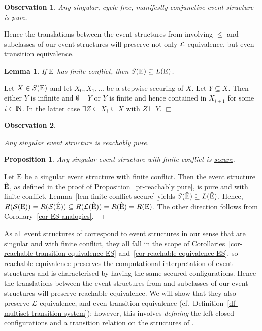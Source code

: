 \documentclass[twocolumn]{article}
\newtheorem{prop}{Proposition}[section]
\newtheorem{lemm}{Lemma}
\newtheorem{obs}{Observation}[section]
\newenvironment{proposition}[1]{\begin{prop} \rm \label{pr-#1} }{\end{prop}}
\newenvironment{lemma}[1]{\begin{lemm} \rm \label{lem-#1} }{\end{lemm}}
\newenvironment{observation}[1]{\begin{obs} \rm \label{obs-#1} }{\end{obs}}
\newenvironment{proof}{\begin{trivlist} \item[\hspace{\labelsep}\bf
Proof:]}{\hfill $\Box$\end{trivlist}}
\newcommand{\df}[1]{Definition~\ref{df-#1}}
\newcommand{\pr}[1]{Proposition~\ref{pr-#1}}
\newcommand{\lem}[1]{Lemma~\ref{lem-#1}}
\newcommand{\cor}[1]{Corollary~\ref{cor-#1}}
\newcommand{\dl}[1]{\mbox{\rm I\hspace{-0.75mm}#1}}     \newcommand{\dc}[1]{\mbox{\rm {\raisebox{.4ex}{\makebox [0pt][l]{\hspace{.2em}\scriptsize $\mid$}}}#1}}
\newcommand{\IN}{\dl{N}}                        \newcommand{\IQ}{\dc{Q}}                        \newcommand{\IC}{\dc{C}}                        \newcommand{\IE}{\dl{E}}                        \newcommand{\IG}{\dc{G}}                        \newcommand{\fC}{{\cal C}}                      \newcommand{\fE}{{\cal E}}                      \newcommand{\fG}{{\cal G}}                      \newcommand{\fN}{{\cal N}}                      \newcommand{\fF}{{\cal F}}                      \newcommand{\fL}{{\cal L}}                      \newcommand{\fM}{{\cal M}}                      \newcommand{\fS}{{\cal S}}                      \newcommand{\fR}{{\cal R}}                      \newcommand{\eC}{{\rm C}}                       \newcommand{\eD}{{\rm D}}                       \newcommand{\eE}{{\rm E}}                       \newcommand{\eF}{{\rm F}}                       \newcommand{\eG}{{\rm G}}                       \newcommand{\eH}{{\rm H}}                       \newcommand{\eK}{{\rm K}}                       \newcommand{\eL}{{\rm L}}                       \newcommand{\eN}{{\rm N}}                       \newcommand{\eP}{{\rm P}}                       \newcommand{\eM}{{\rm M}}                       \newcommand{\eT}{{\rm T}}                       \newcommand{\fT}{{\cal T}}
\begin{document}
\begin{observation}{manifestly conjunctive}
Any singular, cycle-free, manifestly conjunctive event structure is pure.
\end{observation}
Hence the translations between the event structures from
\cite{NPW81,Wi87a,Wi89} involving $\leq$ and subclasses of our event
structures will preserve not only $\fL$-equivalence, but even transition
equivalence.

\begin{lemma}{finite conflict secure}
If $\eE$ has finite conflict, then $S(\eE)\subseteq L(\eE)$.
\end{lemma}
\begin{proof}
Let $X \in S(\eE)$ and let $X_0,X_1,\ldots$ be a stepwise securing of $X$.
Let $Y \subseteq X$. Then either $Y$ is infinite and $\emptyset \vdash Y$ or
$Y$ is finite and hence contained in $X_{i+1}$ for some $i\in\IN$.
In the latter case $\exists Z\subseteq X_i \subseteq X$ with $Z \vdash Y$.
\end{proof}

\begin{observation}{singular}~\vspace{-6pt}
\item Any singular event structure is reachably pure.
\end{observation}

\begin{proposition}{finite conflict secure}
Any singular event structure with finite conflict is \hyperref[secure]{secure}.
\end{proposition}
\begin{proof}
Let $\eE$ be a singular event structure with finite conflict.
Then the event structure $\hat\eE$, as defined in the proof of
\pr{reachably pure}, is pure and with finite conflict. \lem{finite
conflict secure} yields $S(\hat\eE) \subseteq L(\hat\eE)$.  Hence,
$R(\fS(\eE)) = R(\fS(\hat\eE)) \subseteq R(\fL(\hat\eE))=R(\hat\eE)=R(\eE)$.
The other direction follows from \cor{ES analogies}.
\end{proof}
As all event structures of \cite{NPW81,Wi87a,Wi89} correspond to event
structures in our sense that are singular and with finite conflict,
they all fall in the scope of Corollaries~\ref{cor-reachable
transition equivalence ES} and~\ref{cor-reachable equivalence ES}, so
reachable equivalence preserves the computational interpretation of
event structures and is characterised by having the same secured
configurations. Hence the translations between the event structures
from \cite{Wi87a,Wi89} and subclasses of our event structures will
preserve reachable equivalence. We will show that they also preserve
$\fL$-equivalence, and even transition equivalence
(cf.~\df{multiset-transition system}); however, this involves {\em
defining} the left-closed configurations and a transition relation on
the structures of \cite{Wi87a,Wi89}.
\end{document}

